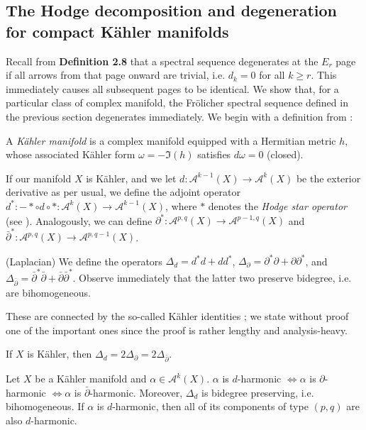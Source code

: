 \subsection{The Hodge decomposition and degeneration for compact K\"ahler manifolds}
Recall from \textbf{Definition 2.8} that a spectral sequence degenerates at the $E_r$ page if all arrows from that page onward are trivial, i.e. $d_k=0$ for all $k\geq r$. This immediately causes all subsequent pages to be identical. We show that, for a particular class of complex manifold, the Fr\"olicher spectral sequence defined in the previous section degenerates immediately. We begin with a definition from \cite[Chapter 3]{VoisinI2002}:

\begin{definition}
    A \emph{K\"ahler manifold} is a complex manifold equipped with a Hermitian metric $h$, whose associated K\"ahler form $\omega = -\Im(h)$ satisfies $d\omega =0$ (closed). 
\end{definition}

\noindent If our manifold $X$ is K\"ahler, and we let $d:\mathcal{A}^{k-1}(X) \to \mathcal{A}^k(X)$ be the exterior derivative as per usual, we define the adjoint operator $d^*: -*\circ d\circ *:\mathcal{A}^k(X) \to \mathcal{A}^{k-1}(X)$, where $*$ denotes the \emph{Hodge star operator} (see \cite[Section 1.2]{Huybrechts2005}). Analogously, we can define $\partial^*:\mathcal{A}^{p,q}(X) \to \mathcal{A}^{p-1,q}(X)$ and $\bar\partial^*:\mathcal{A}^{p,q}(X) \to \mathcal{A}^{p,q-1}(X)$.

\begin{definition}
    (Laplacian) We define the operators $\Delta_d = d^*d + dd^*$, $\Delta_\partial = \partial^*\partial+\partial\partial^*$, and $\Delta_{\bar \partial} = \bar\partial^*\bar\partial + \bar\partial \bar\partial^*$. Observe immediately that the latter two preserve bidegree, i.e. are bihomogeneous.
\end{definition}

\noindent These are connected by the so-called K\"ahler identities \cite[Proposition 3.1.12]{Huybrechts2005}; we state without proof one of the important ones since the proof is rather lengthy and analysis-heavy.

\begin{lemma}
If $X$ is K\"ahler, then $\Delta_d = 2\Delta_\partial = 2\Delta_{\bar \partial}$.
\end{lemma}

\begin{corollary}
    Let $X$ be a K\"ahler manifold and $\alpha\in \mathcal{A}^k(X)$. $\alpha$ is $d$-harmonic $\iff \alpha$ is $\partial$-harmonic $\iff \alpha$ is $\bar\partial$-harmonic. Moreover, $\Delta_d$ is bidegree preserving, i.e. bihomogeneous. If $\alpha$ is $d$-harmonic, then all of its components of type $(p,q)$ are also $d$-harmonic. 
\end{corollary}

